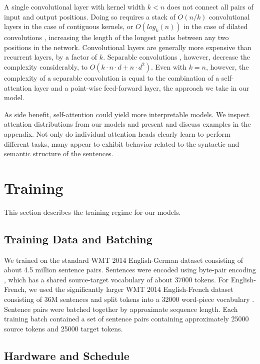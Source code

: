 \documentclass{article}
\begin{document}
A single convolutional layer with kernel width $k < n$ does not connect all pairs of input and output positions. Doing so requires a stack of $O(n/k)$ convolutional layers in the case of contiguous kernels, or $O(log_k(n))$ in the case of dilated convolutions \citep{NalBytenet2017}, increasing the length of the longest paths between any two positions in the network.
Convolutional layers are generally more expensive than recurrent layers, by a factor of $k$. Separable convolutions \citep{xception2016}, however, decrease the complexity considerably, to $O(k \cdot n \cdot d + n \cdot d^2)$. Even with $k=n$, however, the complexity of a separable convolution is equal to the combination of a self-attention layer and a point-wise feed-forward layer, the approach we take in our model.

As side benefit, self-attention could yield more interpretable models. We inspect attention distributions from our models and present and discuss examples in the appendix. Not only do individual attention heads clearly learn to perform different tasks, many appear to exhibit behavior related to the syntactic and semantic structure of the sentences.

\section{Training}

This section describes the training regime for our models. 

\subsection{Training Data and Batching}
We trained on the standard WMT 2014 English-German dataset consisting of about 4.5 million sentence pairs.  Sentences were encoded using byte-pair encoding \citep{DBLP:journals/corr/BritzGLL17}, which has a shared source-target vocabulary of about 37000 tokens. For English-French, we used the significantly larger WMT 2014 English-French dataset consisting of 36M sentences and split tokens into a 32000 word-piece vocabulary \citep{wu2016google}.  Sentence pairs were batched together by approximate sequence length.  Each training batch contained a set of sentence pairs containing approximately 25000 source tokens and 25000 target tokens.  

\subsection{Hardware and Schedule}
\end{document}
